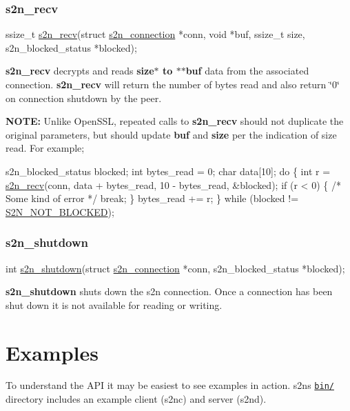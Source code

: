 \subsubsection*{s2n\+\_\+recv}


\begin{DoxyCode}
ssize\_t \hyperlink{s2n_8h_afede11e597a4db3024ec2b68733a643d}{s2n\_recv}(\textcolor{keyword}{struct} \hyperlink{structs2n__connection}{s2n\_connection} *conn,
             \textcolor{keywordtype}{void} *buf,
             ssize\_t size,
             s2n\_blocked\_status *blocked);
\end{DoxyCode}


{\bfseries s2n\+\_\+recv} decrypts and reads {\bfseries size$\ast$ to $\ast$$\ast$buf} data from the associated connection. {\bfseries s2n\+\_\+recv} will return the number of bytes read and also return \char`\"{}0\char`\"{} on connection shutdown by the peer.

{\bfseries N\+O\+TE\+:} Unlike Open\+S\+SL, repeated calls to {\bfseries s2n\+\_\+recv} should not duplicate the original parameters, but should update {\bfseries buf} and {\bfseries size} per the indication of size read. For example;


\begin{DoxyCode}
s2n\_blocked\_status blocked;
\textcolor{keywordtype}{int} bytes\_read = 0;
\textcolor{keywordtype}{char} data[10];
\textcolor{keywordflow}{do} \{
    \textcolor{keywordtype}{int} r = \hyperlink{s2n_8h_afede11e597a4db3024ec2b68733a643d}{s2n\_recv}(conn, data + bytes\_read, 10 - bytes\_read, &blocked);
    \textcolor{keywordflow}{if} (r < 0) \{
        \textcolor{comment}{/* Some kind of error */}
        \textcolor{keywordflow}{break};
    \}
    bytes\_read += r;
\} \textcolor{keywordflow}{while} (blocked != \hyperlink{s2n_8h_af70ca0b089daa98cd79a424d3f6af15da7afdc9e789b567fe89c7142f34ec3ebd}{S2N\_NOT\_BLOCKED});
\end{DoxyCode}


\subsubsection*{s2n\+\_\+shutdown}


\begin{DoxyCode}
\textcolor{keywordtype}{int} \hyperlink{s2n_8h_a1cb034f97199a7f7d7888a447cf0fe67}{s2n\_shutdown}(\textcolor{keyword}{struct} \hyperlink{structs2n__connection}{s2n\_connection} *conn,
                 s2n\_blocked\_status *blocked);
\end{DoxyCode}


{\bfseries s2n\+\_\+shutdown} shuts down the s2n connection. Once a connection has been shut down it is not available for reading or writing.

\section*{Examples}

To understand the A\+PI it may be easiest to see examples in action. s2n\textquotesingle{}s \href{https://github.com/awslabs/s2n/blob/master/bin/}{\tt bin/} directory includes an example client (s2nc) and server (s2nd). 